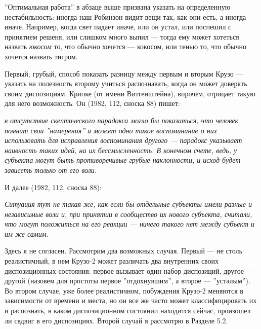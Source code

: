 \documentclass[11pt]{book}
\begin{document}
''Оптимальная работа'' в абзаце выше призвана указать на определенную нестабильность: иногда наш Робинзон видит вещи так, как они есть, а иногда --- иначе. Например, когда свет падает иначе, или он устал, или поспешил с принятием решеня, или слишком много выпил --- тогда ему может хотеться назвать \textit{юкосом} то, что обычно хочется --- кокосом, или тенью то, что обычно хочется назвать тигром.

Первый, грубый, способ показать разницу между первым и вторым Крузо --- указать на полезность второму учиться распознавать, когда он может доверять своим диспозициям. Крипке (от имени Витгенштейна), впрочем, отрицает такую для него возможность. Он (1982, 112, сноска 88) пишет:

\smallskip

\textit{в отсутствие скептического парадокса могло бы показаться, что человек помнит свои ''намерения'' и может одно такое воспоминание о них использовать для исправления воспоминания другого --- парадокс указывает наивность таких идей, на их бессмысленность. В конечном счете, ведь, у субъекта могут быть противоречивые грубые наклонности, и исход будет зависеть только от его воли.}

\smallskip

И далее (1982, 112, сноска 88):

\smallskip

\textit{Ситуация тут не такая же, как если бы отдельные субъекты имели разные и независимые воли и, при принятии в сообщество их нового субъекта, считали, что могут положиться на его реакции --- ничего такого нет между субъект и им же самим.}

\smallskip

Здесь я не согласен. Рассмотрим два возможных случая. Первый --- не столь реалистичный, в нем Крузо-2 может различать два внутренних своих диспозиционных состояния: первое вызывает один набор диспозиций, другое --- другой (назовем для простоты первое ''отдохнувшим'', а второе --- ''усталым''). Во втором случае, уже более реалистичном, побуждения Крузо-2 меняются в зависимости от времени и места, но он все же часто может классифицировать их и распознать, в каком диспозиционном состоянии находится сейчас, произошел ли свдвиг в его диспозициях. Второй случай я рассмотрю в Разделе 5.2.
\end{document}
